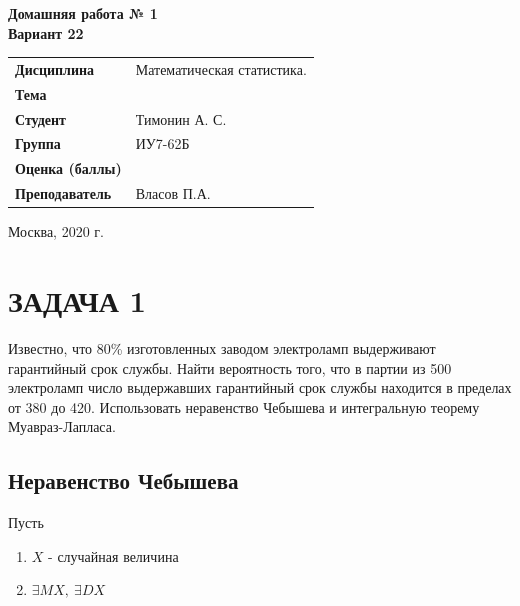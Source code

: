 \documentclass[12pt, a4paper]{report}
\begin{document}
\begin{titlepage}
  	\vspace{2cm}
  	
  	\begin{center}
  		\textbf{Домашняя работа № 1} \\
  		\vspace{0.5cm}
  		\textbf{Вариант 22}
  	\end{center}
  	
  	\vspace{4cm}
  	
  	\begin{flushleft}
  		\begin{tabular}{ll}
  			\textbf{Дисциплина} & Математическая статистика. \\
  			\textbf{Тема} & \\
  			\textbf{Студент} & Тимонин А. С. \\
  			\textbf{Группа} & ИУ7-62Б \\
  			\textbf{Оценка (баллы)} & \\
  			\textbf{Преподаватель} & Власов П.А. \\
  		\end{tabular}
  	\end{flushleft}
  	
  	\vspace{6cm}
  	
  	\begin{center}
  		Москва, 2020 г.
  	\end{center}
  	
  	
  \end{titlepage}
  
	
	\section{ЗАДАЧА 1}
	
	\hspace{1cm} Известно, что 80\% изготовленных заводом электроламп выдерживают гарантийный срок службы. Найти вероятность того, что в партии из 500 электроламп число выдержавших гарантийный срок службы находится в пределах от 380 до 420. Использовать неравенство Чебышева и интегральную теорему Муавраз-Лапласа.
	
	\subsection{Неравенство Чебышева}
	
	Пусть
	
	\begin{enumerate}
		\item $X$ - случайная величина
		\item $\exists MX,\ \exists DX$
	\end{enumerate}
\end{document}

